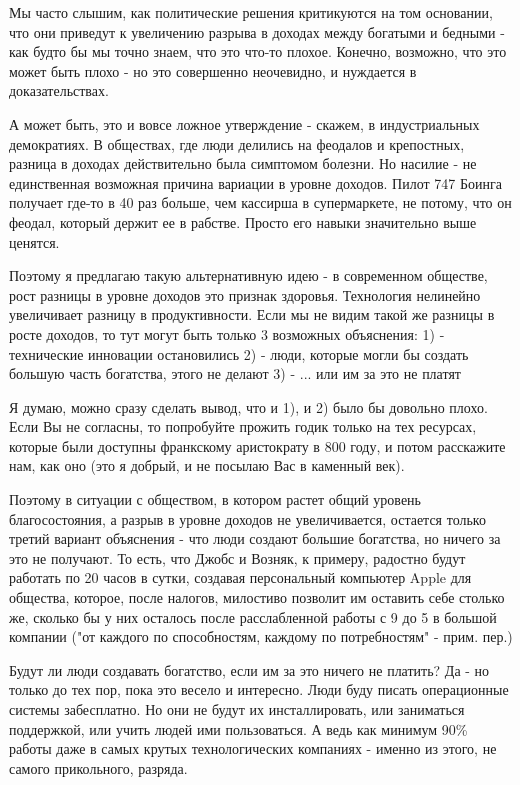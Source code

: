 \documentclass[ebook,12pt,oneside,openany]{memoir}
\begin{document}
Мы часто слышим, как политические решения критикуются на том
основании, что они приведут к увеличению разрыва в доходах между
богатыми и бедными - как будто бы мы точно знаем, что это что-то
плохое. Конечно, возможно, что это может быть плохо - но это
совершенно неочевидно, и нуждается в доказательствах.

А может быть, это и вовсе ложное утверждение - скажем, в
индустриальных демократиях. В обществах, где люди делились на феодалов
и крепостных, разница в доходах действительно была симптомом болезни.
Но насилие - не единственная возможная причина вариации в уровне
доходов. Пилот 747 Боинга получает где-то в 40 раз больше, чем
кассирша в супермаркете, не потому, что он феодал, который держит ее в
рабстве. Просто его навыки значительно выше ценятся.

Поэтому я предлагаю такую альтернативную идею - в современном
обществе, рост разницы в уровне доходов это признак здоровья.
Технология нелинейно увеличивает разницу в продуктивности. Если мы не
видим такой же разницы в росте доходов, то тут могут быть только 3
возможных объяснения: 1) - технические инновации остановились 2) -
люди, которые могли бы создать большую часть богатства, этого не
делают 3) - ... или им за это не платят

Я думаю, можно сразу сделать вывод, что и 1), и 2) было бы довольно
плохо. Если Вы не согласны, то попробуйте прожить годик только на тех
ресурсах, которые были доступны франкскому аристократу в 800 году, и
потом расскажите нам, как оно (это я добрый, и не посылаю Вас в
каменный век).

Поэтому в ситуации с обществом, в котором растет общий уровень
благосостояния, а разрыв в уровне доходов не увеличивается, остается
только третий вариант объяснения - что люди создают большие богатства,
но ничего за это не получают. То есть, что Джобс и Возняк, к примеру,
радостно будут работать по 20 часов в сутки, создавая персональный
компьютер Apple для общества, которое, после налогов, милостиво
позволит им оставить себе столько же, сколько бы у них осталось после
расслабленной работы с 9 до 5 в большой компании ("от каждого по
способностям, каждому по потребностям" - прим. пер.)

Будут ли люди создавать богатство, если им за это ничего не платить?
Да - но только до тех пор, пока это весело и интересно. Люди буду
писать операционные системы забесплатно. Но они не будут их
инсталлировать, или заниматься поддержкой, или учить людей ими
пользоваться. А ведь как минимум 90\% работы даже в самых крутых
технологических компаниях - именно из этого, не самого прикольного,
разряда.
\end{document}
